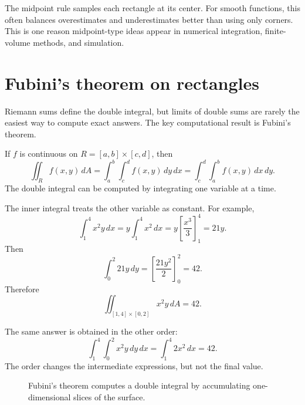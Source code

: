 \documentclass[11pt]{article}
\newcommand{\dA}{\,dA}
\newcommand{\dd}{\,d}
\begin{document}
\begin{tipbox}
The midpoint rule samples each rectangle at its center. For smooth functions, this often balances overestimates and underestimates better than using only corners. This is one reason midpoint-type ideas appear in numerical integration, finite-volume methods, and simulation.
\end{tipbox}

\section{Fubini's theorem on rectangles}

Riemann sums define the double integral, but limits of double sums are rarely the easiest way to compute exact answers. The key computational result is Fubini's theorem.

\begin{importantbox}
If $f$ is continuous on $R=[a,b]\times[c,d]$, then
\[
\iint_R f(x,y)\dA=\int_a^b\int_c^d f(x,y)\dd y\dd x=\int_c^d\int_a^b f(x,y)\dd x\dd y.
\]
The double integral can be computed by integrating one variable at a time.
\end{importantbox}

The inner integral treats the other variable as constant. For example,
\[
\int_1^4 x^2y\dd x=y\int_1^4x^2\dd x=y\left[\frac{x^3}{3}\right]_1^4=21y.
\]
Then
\[
\int_0^2 21y\dd y=\left[\frac{21y^2}{2}\right]_0^2=42.
\]
Therefore
\[
\iint_{[1,4]\times[0,2]}x^2y\dA=42.
\]

The same answer is obtained in the other order:
\[
\int_1^4\int_0^2 x^2y\dd y\dd x=\int_1^4 2x^2\dd x=42.
\]
The order changes the intermediate expressions, but not the final value.

\begin{figure}[H]
\centering
{}
\caption{Fubini's theorem computes a double integral by accumulating one-dimensional slices of the surface.}
\end{figure}
\end{document}
